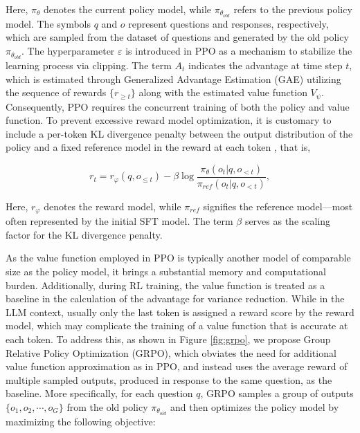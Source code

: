 \begin{itemize}[topsep=0pt]
\begin{itemize}[topsep=0pt]
Here, $\pi_{\theta}$ denotes the current policy model, while $\pi_{\theta_{old}}$ refers to the previous policy model. The symbols $q$ and $o$ represent questions and responses, respectively, which are sampled from the dataset of questions and generated by the old policy $\pi_{\theta_{old}}$. The hyperparameter $\varepsilon$ is introduced in PPO as a mechanism to stabilize the learning process via clipping. The term $A_t$ indicates the advantage at time step $t$, which is estimated through Generalized Advantage Estimation (GAE) \citep{gae} utilizing the sequence of rewards $\{r_{\ge t}\}$ along with the estimated value function $V_{\psi}$. Consequently, PPO requires the concurrent training of both the policy and value function. To prevent excessive reward model optimization, it is customary to include a per-token KL divergence penalty between the output distribution of the policy and a fixed reference model in the reward at each token \citep{ouyang2022training}, that is,

\begin{equation}
    r_{t} = r_\varphi(q, o_{\le t}) - \beta \log\frac{\pi_{\theta}(o_{t}|q, o_{<t})}{\pi_{ref}(o_{t}|q, o_{<t})},
\label{eq:PPO-reward}
\end{equation}

Here, $r_\varphi$ denotes the reward model, while $\pi_{ref}$ signifies the reference model—most often represented by the initial SFT model. The term $\beta$ serves as the scaling factor for the KL divergence penalty.

As the value function employed in PPO is typically another model of comparable size as the policy model, it brings a substantial memory and computational burden. Additionally, during RL training, the value function is treated as a baseline in the calculation of the advantage for variance reduction. While in the LLM context, usually only the last token is assigned a reward score by the reward model, which may complicate the training of a value function that is accurate at each token. To address this, as shown in Figure \ref{fig:grpo}, we propose Group Relative Policy Optimization (GRPO), which obviates the need for additional value function approximation as in PPO, and instead uses the average reward of multiple sampled outputs, produced in response to the same question, as the baseline. More specifically, for each question $q$, GRPO samples a group of outputs $\{o_1, o_2, \cdots, o_G\}$  from the old policy  $\pi_{\theta_{old}}$  and then optimizes the policy model by maximizing the following objective:


\end{itemize}
\end{itemize}
